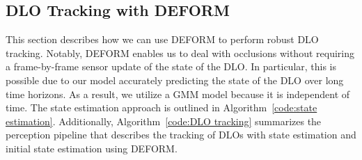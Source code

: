 \subsection{DLO Tracking with DEFORM}
\label{sec:tracking}

This section describes how we can use DEFORM to perform robust DLO tracking.
Notably, DEFORM enables us to deal with occlusions without requiring a frame-by-frame sensor update of the state of the DLO. 
In particular, this is possible due to our model accurately predicting the state of the DLO over long time horizons. 
As a result, we utilize a GMM model because it is independent of time. 
The state estimation approach is outlined in Algorithm~\ref{code:state estimation}. 
Additionally, Algorithm~\ref{code:DLO tracking} summarizes the perception pipeline that describes the tracking of DLOs with state estimation and initial state estimation using DEFORM.

